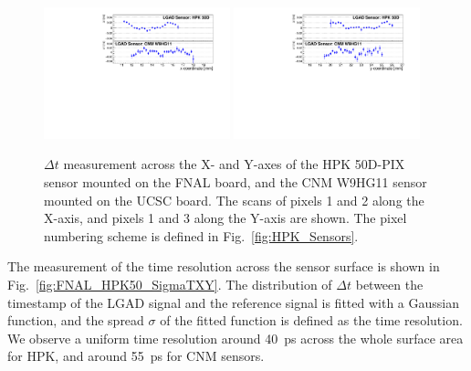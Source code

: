 \documentclass[preprint,1p]{elsarticle}
\begin{document}
\begin{figure}[htbp] 
\centering
\includegraphics[width=0.48\textwidth]{figs/HPK50DVsCNM_MeanTime_vs_X.pdf}
\includegraphics[width=0.48\textwidth]{figs/HPK50DVsCNM_MeanTime_vs_Y.pdf}
\caption{$\Delta t$ measurement across the X- and Y-axes of the HPK 50D-PIX sensor 
mounted on the FNAL board, and the CNM W9HG11 sensor mounted on the 
UCSC board. The scans of pixels 1 and 2 along the X-axis, and 
pixels 1 and 3 along the Y-axis are shown. The pixel numbering scheme is defined in Fig.~\ref{fig:HPK_Sensors}.} 
\label{fig:FNAL_HPK50_DTXY} 
\end{figure} 

The measurement of the time resolution across the sensor surface is shown in
Fig.~\ref{fig:FNAL_HPK50_SigmaTXY}. The distribution of $\Delta t$ between the timestamp
of the LGAD signal and the reference signal is fitted with a Gaussian function, and
the spread $\sigma$ of the fitted function is defined as
the time resolution. We observe a uniform time resolution around 40~ps across
the whole surface area for HPK, and around 55~ps for CNM sensors.
\end{document}
